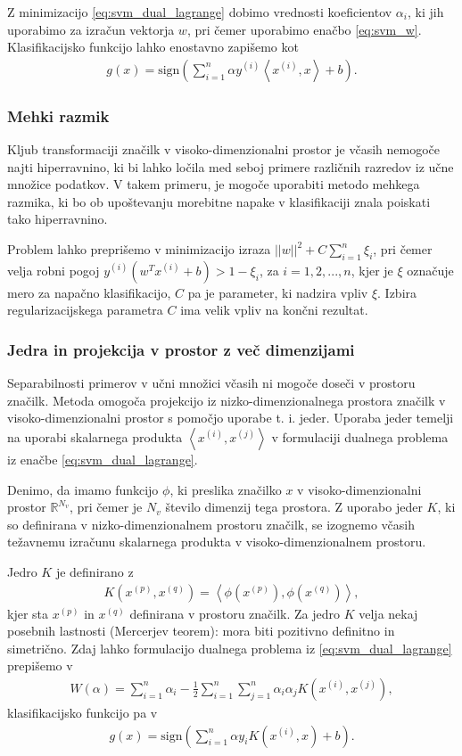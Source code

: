\documentclass[11pt,a4paper,openany]{book}
\begin{document}
Z minimizacijo \ref{eq:svm_dual_lagrange} dobimo vrednosti koeficientov $\alpha_i$, ki jih uporabimo za izračun vektorja $w$, pri čemer uporabimo enačbo \ref{eq:svm_w}. Klasifikacijsko funkcijo lahko enostavno zapišemo kot
\begin{eqnarray}
	g(x) = \text{sign} \left(\sum^n_{i=1} \alpha y^{(i)} \left<x^{(i)},x\right> + b\right).
\end{eqnarray}

\subsubsection{Mehki razmik}
Kljub transformaciji značilk v visoko-dimenzionalni prostor je včasih nemogoče najti hiperravnino, ki bi lahko ločila med seboj primere različnih razredov iz učne množice podatkov. V takem primeru, je mogoče uporabiti metodo mehkega razmika, ki bo ob upoštevanju morebitne napake v klasifikaciji znala poiskati tako hiperravnino. 

Problem lahko preprišemo v minimizacijo izraza $||w||^2 + C\sum^n_{i=1}\xi_i$, pri čemer velja robni pogoj $y^{(i)}(w^Tx^{(i)} + b) > 1 - \xi_i$, za $i = 1, 2, ..., n$, kjer je $\xi$ označuje mero za napačno klasifikacijo, $C$ pa je parameter, ki nadzira vpliv $\xi$. Izbira regularizacijskega parametra $C$ ima velik vpliv na končni rezultat.

\subsubsection{Jedra in projekcija v prostor z več dimenzijami}
Separabilnosti primerov v učni množici včasih ni mogoče doseči v prostoru značilk. Metoda omogoča projekcijo iz nizko-dimenzionalnega prostora značilk v visoko-dimenzionalni prostor s pomočjo uporabe t. i. jeder. Uporaba jeder temelji na uporabi skalarnega produkta $\left<x^{(i)}, x^{(j)}\right>$ v formulaciji dualnega problema iz enačbe \ref{eq:svm_dual_lagrange}. 

Denimo, da imamo funkcijo $\phi$, ki preslika značilko $x$ v visoko-dimenzionalni prostor $\mathbb{R}^{N_v}$, pri čemer je $N_v$ število dimenzij tega prostora. Z uporabo jeder $K$, ki so definirana v nizko-dimenzionalnem prostoru značilk, se izognemo včasih težavnemu izračunu skalarnega produkta v visoko-dimenzionalnem prostoru.

Jedro $K$ je definirano z
\begin{eqnarray}
	K(x^{(p)}, x^{(q)}) = \left<\phi(x^{(p)}), \phi(x^{(q)})\right>,
\end{eqnarray}
kjer sta $x^{(p)}$ in $x^{(q)}$ definirana v prostoru značilk. Za jedro $K$ velja nekaj posebnih lastnosti (Mercerjev teorem): mora biti pozitivno definitno in simetrično. Zdaj lahko formulacijo dualnega problema iz \ref{eq:svm_dual_lagrange} prepišemo v 
\begin{eqnarray}
	W(\alpha) = \sum^n_{i = 1}\alpha_i - \frac{1}{2} \sum^n_{i=1} \sum^n_{j=1} \alpha_i \alpha_j K(x^{(i)}, x^{(j)}),
\end{eqnarray}
klasifikacijsko funkcijo pa v
\begin{eqnarray}
	g(x) = \text{sign} \left(\sum^n_{i=1}\alpha y_i K(x^{(i)}, x) + b \right).
\end{eqnarray}
\end{document}
